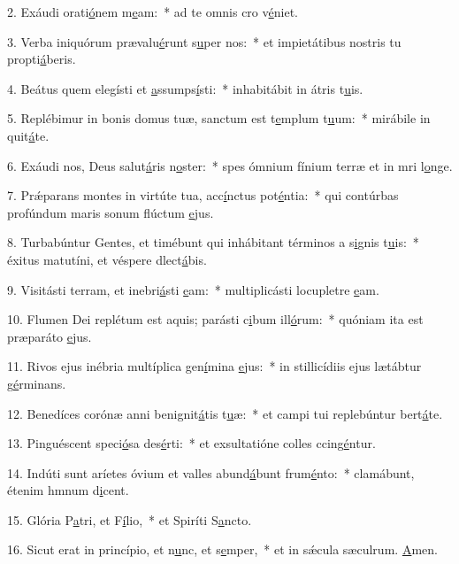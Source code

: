 2. Exáudi orati\uline{ó}nem m\uline{e}am:~* ad te omnis cro v\uline{é}niet.\par 
3. Verba iniquórum prævalu\uline{é}runt s\uline{u}per nos:~* et impietátibus nostris tu propti\uline{á}beris.\par 
4. Beátus quem elegísti et \uline{a}ssumps\uline{í}sti:~* inhabitábit in átris t\uline{u}is.\par 
5. Replébimur in bonis domus tuæ, sanctum est t\uline{e}mplum t\uline{u}um:~* mirábile in quit\uline{á}te.\par 
6. Exáudi nos, Deus salut\uline{á}ris n\uline{o}ster:~* spes ómnium fínium terræ et in mri l\uline{o}nge.\par 
7. Prǽparans montes in virtúte tua, acc\uline{í}nctus pot\uline{é}ntia:~* qui contúrbas profúndum maris sonum flúctum \uline{e}jus.\par 
8. Turbabúntur Gentes, et timébunt qui inhábitant términos a s\uline{i}gnis t\uline{u}is:~* éxitus matutíni, et véspere dlect\uline{á}bis.\par 
9. Visitásti terram, et inebri\uline{á}sti \uline{e}am:~* multiplicásti locupletre \uline{e}am.\par 
10. Flumen Dei replétum est aquis; parásti c\uline{i}bum ill\uline{ó}rum:~* quóniam ita est præparáto \uline{e}jus.\par 
11. Rivos ejus inébria multíplica gen\uline{í}mina \uline{e}jus:~* in stillicídiis ejus lætábtur g\uline{é}rminans.\par 
12. Benedíces corónæ anni benignit\uline{á}tis t\uline{u}æ:~* et campi tui replebúntur bert\uline{á}te.\par 
13. Pinguéscent speci\uline{ó}sa des\uline{é}rti:~* et exsultatióne colles ccing\uline{é}ntur.\par 
14. Indúti sunt aríetes óvium et valles abund\uline{á}bunt frum\uline{é}nto:~* clamábunt, étenim hmnum d\uline{i}cent.\par 
15. Glória P\uline{a}tri, et F\uline{í}lio,~* et Spiríti S\uline{a}ncto.\par 
16. Sicut erat in princípio, et n\uline{u}nc, et s\uline{e}mper,~* et in sǽcula sæculrum. \uline{A}men.\par 
